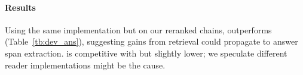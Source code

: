  


\paragraph{Results}

Using the same implementation but on our reranked chains, \name{}
outperforms \grr{} (Table~\ref{tb:dev_ans}), suggesting gains from
retrieval could propagate to answer span extraction.
%
\name{} is competitive with  but slightly lower; we speculate
different reader implementations might be the cause.

